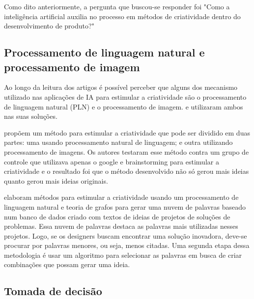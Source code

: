 Como dito anteriormente, a pergunta que buscou-se responder foi "Como a inteligência artificial auxilia no processo em métodos de criatividade dentro do desenvolvimento de produto?"

\subsection*{Processamento de linguagem natural e processamento de imagem}

Ao longo da leitura dos artigos é possível perceber que alguns dos mecanismo utilizado nas aplicações de IA para estimular a criatividade são o processamento de linguagem natural (PLN) e o processamento de imagem.  e  utilizaram ambos nas suas soluções.

 propõem um método para estimular a criatividade que pode ser dividido em duas partes: uma usando processamento natural de linguagem; e outra utilizando processamento de imagens. Os autores testaram esse método contra um grupo de controle que utilizava apenas o google e brainstorming para estimular a criatividade e o resultado foi que o método desenvolvido não só gerou mais ideias quanto gerou mais ideias originais.

 elaboram métodos para estimular a criatividade usando um processamento de linguagem natural e teoria de grafos para gerar uma nuvem de palavras baseado num banco de dados criado com textos de ideias de projetos de soluções de problemas. Essa nuvem de palavras destaca as palavras mais utilizadas nesses projetos. Logo, se os designers buscam encontrar uma solução inovadora, deve-se procurar por palavras menores, ou seja, menos citadas. Uma segunda etapa dessa metodologia é usar um algoritmo para selecionar as palavras em busca de criar combinações que possam gerar uma ideia.




\subsection*{Tomada de decisão}

